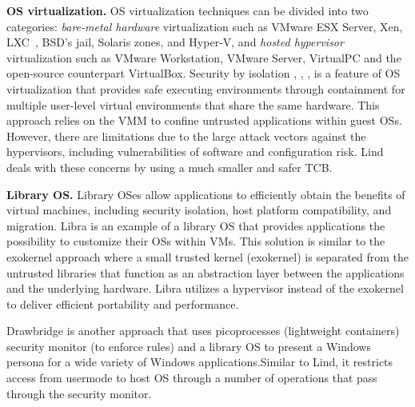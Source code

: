 

\textbf{OS virtualization.}
OS virtualization techniques can be divided into two categories:
\textit{bare-metal hardware} virtualization such as VMware ESX Server, Xen,
LXC~\cite{LXC}, BSD’s jail, Solaris zones, and Hyper-V, and
\textit{hosted hypervisor} virtualization such as VMware
Workstation, VMware Server, VirtualPC and the open-source counterpart
VirtualBox.
%
Security by isolation \cite{Qubes}, \cite{Overshadow},
\cite{SecureVM}, \cite{HypSec} is a feature of OS virtualization that
provides safe executing environments through containment for multiple
user-level virtual environments that share the same hardware. This
approach relies on the VMM to confine untrusted applications within
guest OSs. However, there are limitations due to
the large attack vectors against the hypervisors, including
vulnerabilities of software and configuration risk.
Lind deals with these concerns by using a much smaller and safer TCB.

\textbf{Library OS.}
Library OSes allow applications to efficiently
obtain the benefits of virtual machines,
including security isolation, host platform compatibility, and
migration. Libra \cite {Libra} is an example of a library OS that provides applications the possibility to customize their OSs within VMs. 
This solution is similar to the exokernel approach where a small trusted kernel (exokernel) is separated from the untrusted libraries 
that function as an abstraction layer between the applications and the underlying hardware. 
Libra utilizes a hypervisor instead of the exokernel to deliver efficient portability and performance.

Drawbridge \cite{Drawbridge-11} is another approach that uses picoprocesses (lightweight containers) security monitor (to enforce rules) 
and a library OS to present a Windows persona for a wide variety of Windows applications.Similar to Lind, 
it restricts access from usermode to host OS through a number of operations that pass through the security monitor. 

